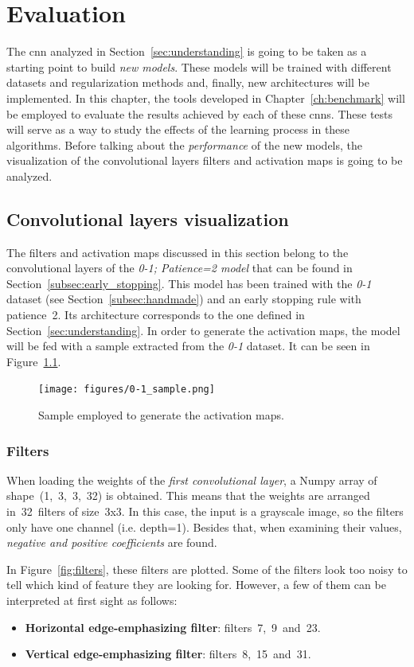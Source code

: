 \chapter{Evaluation}\label{sec:new_models}
The \gls{cnn} analyzed in Section~\ref{sec:understanding} is going to be taken as a starting point to build \emph{new models}. These models will be trained with different datasets and regularization methods and, finally, new architectures will be implemented. In this chapter, the tools developed in Chapter~\ref{ch:benchmark} will be employed to evaluate the results achieved by each of these \glspl{cnn}. These tests will serve as a way to study the effects of the learning process in these algorithms. Before talking about the \emph{performance} of the new models, the visualization of the convolutional layers filters and activation maps is going to be analyzed.

\section{Convolutional layers visualization}
The filters and activation maps discussed in this section belong to the convolutional layers of the \emph{\textit{0-1; Patience=2} model} that can be found in Section~\ref{subsec:early_stopping}. This model has been trained with the \textit{0-1} dataset (see Section~\ref{subsec:handmade}) and an early stopping rule with patience~2. Its architecture corresponds to the one defined in Section~\ref{sec:understanding}. In order to generate the activation maps, the model will be fed with a sample extracted from the \textit{0-1} dataset. It can be seen in Figure~\ref{fig:sample}.
\begin{figure}
	\centering
	\texttt{[image: figures/0-1\_sample.png]}
	\caption{Sample employed to generate the activation maps.}
	\label{fig:sample}
\end{figure}

\subsection{Filters}
When loading the weights of the \emph{first convolutional layer}, a Numpy array of shape~(1,~3,~3,~32) is obtained. This means that the weights are arranged in~32~filters of size~3x3. In this case, the input is a grayscale image, so the filters only have one channel (i.e. depth=1). Besides that, when examining their values, \emph{negative and positive coefficients} are found.

In Figure~\ref{fig:filters}, these filters are plotted. Some of the filters look too noisy to tell which kind of feature they are looking for. However, a few of them can be interpreted at first sight as follows:
\begin{itemize}
	\item \textbf{Horizontal edge-emphasizing filter}: filters~7,~9~and~23.
	\item \textbf{Vertical edge-emphasizing filter}: filters~8,~15~and~31.	
\end{itemize}

